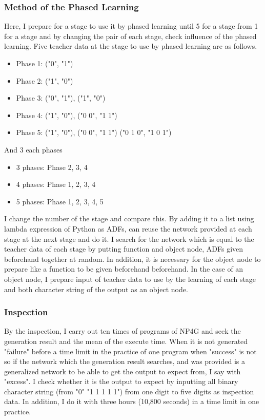 \documentclass{article}
\begin{document}
\subsubsection {Method of the Phased Learning}
\label{sec:PLhow}
Here, I prepare for a stage to use it by phased learning until 5 for a stage from 1 for a stage and by changing the pair of each stage, check influence of the phased learning.
Five teacher data at the stage to use by phased learning are as follows.
\begin{itemize}
\item Phase 1: ("0", "1")
\item Phase 2: ("1", "0")
\item Phase 3: ("0", "1"), ("1", "0")
\item Phase 4: ("1", "0"), ("0 0", "1 1")
\item Phase 5: ("1", "0"), ("0 0", "1 1") ("0 1 0", "1 0 1")
\end{itemize}
And 3 each phases
\begin{itemize}
\item 3 phases:
Phase 2, 3, 4
\item 4 phases:
Phase 1, 2, 3, 4
\item 5 phases:
Phase 1, 2, 3, 4, 5
\end{itemize}
\noindent
I change the number of the stage and compare this.
By adding it to a list using lambda expression of Python as ADFs, can reuse the network provided at each stage at the next stage and do it.
I search for the network which is equal to the teacher data of each stage by putting function and object node, ADFs given beforehand together at random.
In addition, it is necessary for the object node to prepare like a function to be given beforehand beforehand.
In the case of an object node, I prepare input of teacher data to use by the learning of each stage and both character string of the output as an object node.
\subsubsection {Inspection}
By the inspection, I carry out ten times of programs of NP4G and seek the generation result and the mean of the execute time.
When it is not generated "failure" before a time limit in the practice of one program when "success" is not so if the network which the generation result searches, and was provided is a generalized network to be able to get the output to expect from, I say with "excess".
I check whether it is the output to expect by inputting all binary character string (from "0" "1 1 1 1 1") from one digit to five digits as inspection data.
In addition, I do it with three hours (10,800 seconds) in a time limit in one practice.
\end{document}
